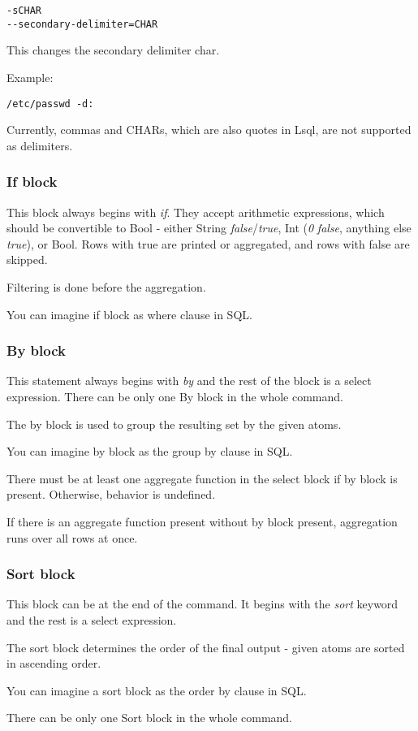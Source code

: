 \begin{verbatim}
-sCHAR
--secondary-delimiter=CHAR
\end{verbatim}
This changes the secondary delimiter char.

Example:
\begin{verbatim}
/etc/passwd -d:
\end{verbatim}

Currently, commas and CHARs, which are also quotes in Lsql, are not supported as delimiters.

\subsubsection{If block}
This block always begins with \textit{if}. They accept arithmetic expressions, which should be convertible to Bool - either String \textit{false}/\textit{true}, Int (\textit{0} \textit{false}, anything else \textit{true}), or Bool. 
Rows with true are printed or aggregated, and rows with false are skipped.

Filtering is done before the aggregation.

You can imagine if block as where clause in SQL.

\subsubsection{By block}
This statement always begins with \textit{by} and the rest of the block is a select expression. There can be only one By block in the whole command.

The by block is used to group the resulting set by the given atoms.

You can imagine by block as the group by clause in SQL. 

There must be at least one aggregate function in the select block if by block is present. Otherwise, behavior is undefined.

If there is an aggregate function present without by block present, aggregation runs over all rows at once.

\subsubsection{Sort block}
This block can be at the end of the command. It begins with the \textit{sort} keyword and the rest is a select expression.

The sort block determines the order of the final output - given atoms are sorted in ascending order.

You can imagine a sort block as the order by clause in SQL.

There can be only one Sort block in the whole command.

